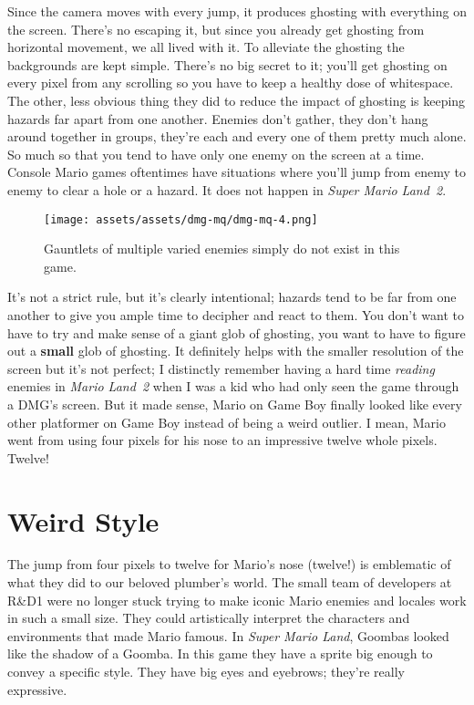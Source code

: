 \documentclass{book}
\begin{document}
Since the camera moves with every jump, it produces ghosting with everything on the screen. There’s no escaping it, but since you already get ghosting from horizontal movement, we all lived with it. To alleviate the ghosting the backgrounds are kept simple. There’s no big secret to it; you’ll get ghosting on every pixel from any scrolling so you have to keep a healthy dose of whitespace. The other, less obvious thing they did to reduce the impact of ghosting is keeping hazards far apart from one another. Enemies don’t gather, they don’t hang around together in groups, they’re each and every one of them pretty much alone. So much so that you tend to have only one enemy on the screen at a time. Console Mario games oftentimes have situations where you’ll jump from enemy to enemy to clear a hole or a hazard. It does not happen in \emph{Super Mario Land 2}.

\begin{figure}[hbt]
\vskip 10pt
\centering \texttt{[image: assets/assets/dmg-mq/dmg-mq-4.png]}\par\pagetwodescription Gauntlets of multiple varied enemies simply do not exist in this game.
\vskip 6pt
\end{figure}

It’s not a strict rule, but it’s clearly intentional; hazards tend to be far from one another to give you ample time to decipher and react to them. You don’t want to have to try and make sense of a giant glob of ghosting, you want to have to figure out a \textbf{small} glob of ghosting. It definitely helps with the smaller resolution of the screen but it’s not perfect; I distinctly remember having a hard time \emph{reading} enemies in \emph{Mario Land 2} when I was a kid who had only seen the game through a DMG’s screen. But it made sense, Mario on Game Boy finally looked like every other platformer on Game Boy instead of being a weird outlier. I mean, Mario went from using four pixels for his nose to an impressive twelve whole pixels. Twelve!

\FloatBarrier\needspace{10mm}\section*{Weird Style}\nopagebreak[4]

The jump from four pixels to twelve for Mario’s nose (twelve!) is emblematic of what they did to our beloved plumber’s world. The small team of developers at R\&D1 were no longer stuck trying to make iconic Mario enemies and locales work in such a small size. They could artistically interpret the characters and environments that made Mario famous. In \emph{Super Mario Land}, Goombas looked like the shadow of a Goomba. In this game they have a sprite big enough to convey a specific style. They have big eyes and eyebrows; they’re really expressive.
\end{document}
